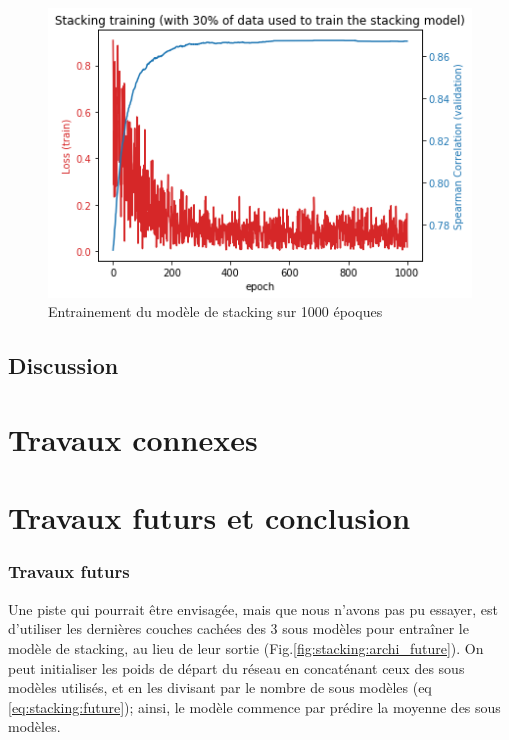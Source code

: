 \documentclass[11pt,a4paper, french]{article}
\begin{document}
\begin{figure}
  \includegraphics[width=\linewidth]{resources/stack-30-training.png}
  \caption{Entrainement du modèle de stacking sur 1000 époques}
  \label{fig:stack:train}
\end{figure}

\subsection{Discussion}


\section{Travaux connexes}



\section{Travaux futurs et conclusion }

%
\subsubsection{Travaux futurs}

Une piste qui pourrait être envisagée, mais que nous n'avons pas pu essayer, est d'utiliser les dernières couches cachées des 3 sous modèles pour entraîner le modèle de stacking, au lieu de leur sortie (Fig.\ref{fig:stacking:archi_future}). On peut initialiser les poids de départ du réseau en concaténant ceux des sous modèles utilisés, et en les divisant par le nombre de sous modèles (eq \ref{eq:stacking:future}); ainsi, le modèle commence par prédire la moyenne des sous modèles.
\end{document}
